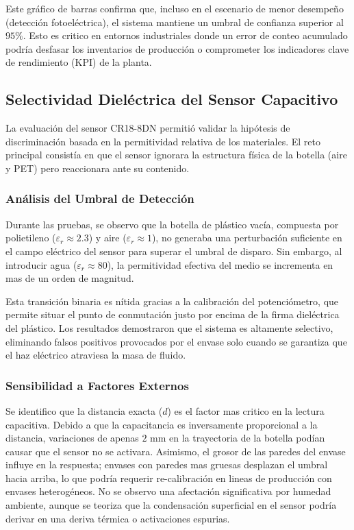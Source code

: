 \documentclass[conference]{IEEEtran}
\begin{document}
Este gráfico de barras confirma que, incluso en el escenario de menor desempeño (detección fotoeléctrica), el sistema mantiene un umbral de confianza superior al $95\%$. Esto es critico en entornos industriales donde un error de conteo acumulado podría desfasar los inventarios de producción o comprometer los indicadores clave de rendimiento (KPI) de la planta.

\subsection{Selectividad Dieléctrica del Sensor Capacitivo}

La evaluación del sensor CR18-8DN permitió validar la hipótesis de discriminación basada en la permitividad relativa de los materiales. El reto principal consistía en que el sensor ignorara la estructura física de la botella (aire y PET) pero reaccionara ante su contenido.

\subsubsection{Análisis del Umbral de Detección}
Durante las pruebas, se observo que la botella de plástico vacía, compuesta por polietileno ($\varepsilon_r \approx 2.3$) y aire ($\varepsilon_r \approx 1$), no generaba una perturbación suficiente en el campo eléctrico del sensor para superar el umbral de disparo. Sin embargo, al introducir agua ($\varepsilon_r \approx 80$), la permitividad efectiva del medio se incrementa en mas de un orden de magnitud. 

Esta transición binaria es nítida gracias a la calibración del potenciómetro, que permite situar el punto de conmutación justo por encima de la firma dieléctrica del plástico. Los resultados demostraron que el sistema es altamente selectivo, eliminando falsos positivos provocados por el envase solo cuando se garantiza que el haz eléctrico atraviesa la masa de fluido.

\subsubsection{Sensibilidad a Factores Externos}
Se identifico que la distancia exacta ($d$) es el factor mas critico en la lectura capacitiva. Debido a que la capacitancia es inversamente proporcional a la distancia, variaciones de apenas $2$ mm en la trayectoria de la botella podían causar que el sensor no se activara. Asimismo, el grosor de las paredes del envase influye en la respuesta; envases con paredes mas gruesas desplazan el umbral hacia arriba, lo que podría requerir re-calibración en lineas de producción con envases heterogéneos. No se observo una afectación significativa por humedad ambiente, aunque se teoriza que la condensación superficial en el sensor podría derivar en una deriva térmica o activaciones espurias.
\end{document}
